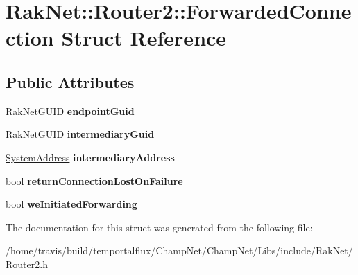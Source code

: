 \hypertarget{struct_rak_net_1_1_router2_1_1_forwarded_connection}{\section{Rak\-Net\-:\-:Router2\-:\-:Forwarded\-Connection Struct Reference}
\label{struct_rak_net_1_1_router2_1_1_forwarded_connection}
}
\subsection*{Public Attributes}
\begin{DoxyCompactItemize}
\item 
\hypertarget{struct_rak_net_1_1_router2_1_1_forwarded_connection_a1a5b0eae19370b4831f156b7d6097589}{\hyperlink{struct_rak_net_1_1_rak_net_g_u_i_d}{Rak\-Net\-G\-U\-I\-D} {\bfseries endpoint\-Guid}}\label{struct_rak_net_1_1_router2_1_1_forwarded_connection_a1a5b0eae19370b4831f156b7d6097589}

\item 
\hypertarget{struct_rak_net_1_1_router2_1_1_forwarded_connection_a4ef98bf4a55c62cab81d1f761620491e}{\hyperlink{struct_rak_net_1_1_rak_net_g_u_i_d}{Rak\-Net\-G\-U\-I\-D} {\bfseries intermediary\-Guid}}\label{struct_rak_net_1_1_router2_1_1_forwarded_connection_a4ef98bf4a55c62cab81d1f761620491e}

\item 
\hypertarget{struct_rak_net_1_1_router2_1_1_forwarded_connection_ad18f0ebfe8c0933f062a94c34e45df5e}{\hyperlink{struct_rak_net_1_1_system_address}{System\-Address} {\bfseries intermediary\-Address}}\label{struct_rak_net_1_1_router2_1_1_forwarded_connection_ad18f0ebfe8c0933f062a94c34e45df5e}

\item 
\hypertarget{struct_rak_net_1_1_router2_1_1_forwarded_connection_ae789e23fd344a6052726628bf3fa14cc}{bool {\bfseries return\-Connection\-Lost\-On\-Failure}}\label{struct_rak_net_1_1_router2_1_1_forwarded_connection_ae789e23fd344a6052726628bf3fa14cc}

\item 
\hypertarget{struct_rak_net_1_1_router2_1_1_forwarded_connection_aba885d91652e018b98e55b79350453f1}{bool {\bfseries we\-Initiated\-Forwarding}}\label{struct_rak_net_1_1_router2_1_1_forwarded_connection_aba885d91652e018b98e55b79350453f1}

\end{DoxyCompactItemize}


The documentation for this struct was generated from the following file\-:\begin{DoxyCompactItemize}
\item 
/home/travis/build/temportalflux/\-Champ\-Net/\-Champ\-Net/\-Libs/include/\-Rak\-Net/\hyperlink{_router2_8h}{Router2.\-h}\end{DoxyCompactItemize}
